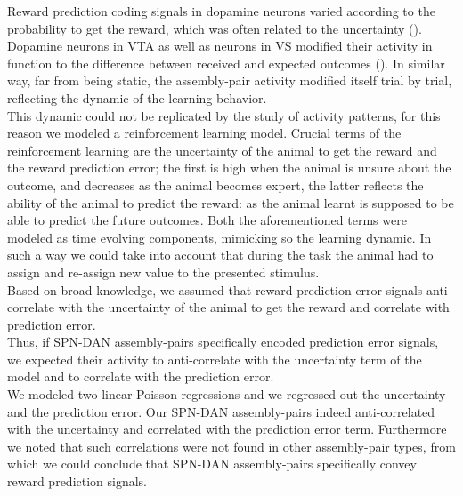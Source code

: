 Reward prediction coding signals in dopamine neurons varied according to the probability to get the reward, which was often related to the uncertainty (\cite{Schultz1992}). Dopamine neurons in VTA as well as neurons in VS modified their activity in function to the difference between received and expected outcomes (\cite{Fiorillo}). In similar way, far from being static, the assembly-pair activity modified itself trial by trial, reflecting the dynamic of the learning behavior.\\This dynamic could not be replicated by the study of activity patterns, for this reason we modeled a reinforcement learning model. Crucial terms of the reinforcement learning are the uncertainty of the animal to get the reward and the reward prediction error; the first is high when the animal is unsure about the outcome, and decreases as the animal becomes expert, the latter reflects the ability of the animal to predict the reward: as the animal learnt is supposed to be able to predict the future outcomes. Both the aforementioned terms were modeled as time evolving components, mimicking so the learning dynamic. In such a way we could take into account that during the task the animal had to assign and re-assign new value to the presented stimulus.\\Based on broad knowledge, we assumed that reward prediction error signals anti-correlate with the uncertainty of the animal to get the reward and correlate with prediction error.\\Thus, if SPN-DAN assembly-pairs specifically encoded prediction error signals, we expected their activity to anti-correlate with the uncertainty term of the model and to correlate with the prediction error.\\We modeled two linear Poisson regressions and we regressed out the uncertainty and the prediction error. Our SPN-DAN assembly-pairs indeed anti-correlated with the uncertainty and correlated with the prediction error term. Furthermore we noted that such correlations were not found in other assembly-pair types, from which we could conclude that SPN-DAN assembly-pairs specifically convey reward prediction signals.  